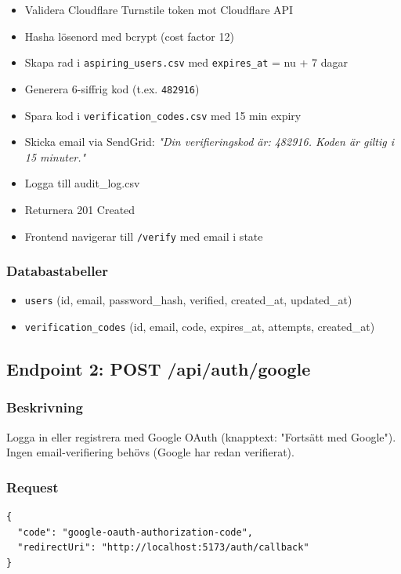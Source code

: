 \documentclass[12pt,a4paper]{article}
\begin{document}
\begin{itemize}[noitemsep]
  \item Validera Cloudflare Turnstile token mot Cloudflare API
  \item Hasha lösenord med bcrypt (cost factor 12)
  \item Skapa rad i \texttt{aspiring\_users.csv} med \texttt{expires\_at} = nu + 7 dagar
  \item Generera 6-siffrig kod (t.ex. \texttt{482916})
  \item Spara kod i \texttt{verification\_codes.csv} med 15 min expiry
  \item Skicka email via SendGrid: \textit{"Din verifieringskod är: 482916. Koden är giltig i 15 minuter."}
  \item Logga till audit\_log.csv
  \item Returnera 201 Created
  \item Frontend navigerar till \texttt{/verify} med email i state
\end{itemize}

\subsubsection{Databastabeller}
\begin{itemize}[noitemsep]
  \item \texttt{users} (id, email, password\_hash, verified, created\_at, updated\_at)
  \item \texttt{verification\_codes} (id, email, code, expires\_at, attempts, created\_at)
\end{itemize}

\subsection{Endpoint 2: POST /api/auth/google}

\subsubsection{Beskrivning}
Logga in eller registrera med Google OAuth (knapptext: "Fortsätt med Google"). Ingen email-verifiering behövs (Google har redan verifierat).

\subsubsection{Request}
\begin{lstlisting}
{
  "code": "google-oauth-authorization-code",
  "redirectUri": "http://localhost:5173/auth/callback"
}
\end{lstlisting}
\end{document}
